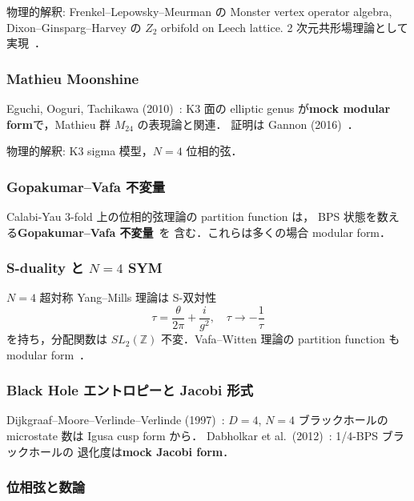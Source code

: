 \documentclass[11pt,a4paper]{article}
\begin{document}
物理的解釈: Frenkel--Lepowsky--Meurman の Monster vertex operator algebra,
Dixon--Ginsparg--Harvey の $Z_2$ orbifold on Leech lattice.
2 次元共形場理論として実現~\cite{FLM1988}．

\subsubsection{Mathieu Moonshine}

Eguchi, Ooguri, Tachikawa (2010)~\cite{EOT2010}: K3 面の elliptic genus
が\textbf{mock modular form}で，Mathieu 群 $M_{24}$ の表現論と関連．
証明は Gannon (2016)~\cite{Gannon2016}．

物理的解釈: K3 sigma 模型，$N = 4$ 位相的弦．

\subsubsection{Gopakumar--Vafa 不変量}

Calabi-Yau 3-fold 上の位相的弦理論の partition function は，
BPS 状態を数える\textbf{Gopakumar--Vafa 不変量}~\cite{GV1998}を
含む．これらは多くの場合 modular form．

\subsubsection{S-duality と $N = 4$ SYM}

$N = 4$ 超対称 Yang--Mills 理論は S-双対性
\begin{equation}
\tau = \frac{\theta}{2\pi} + \frac{i}{g^2}, \quad \tau \to -\frac{1}{\tau}
\end{equation}
を持ち，分配関数は $SL_2(\mathbb{Z})$ 不変．Vafa--Witten 理論の partition
function も modular form~\cite{VafaWitten1994}．

\subsubsection{Black Hole エントロピーと Jacobi 形式}

Dijkgraaf--Moore--Verlinde--Verlinde (1997)~\cite{DMVV1997}: $D = 4$, $N = 4$
ブラックホールの microstate 数は Igusa cusp form から．
Dabholkar et al.\ (2012)~\cite{Dabholkar2012}: 1/4-BPS ブラックホールの
退化度は\textbf{mock Jacobi form}．

\subsubsection{位相弦と数論}
\end{document}
